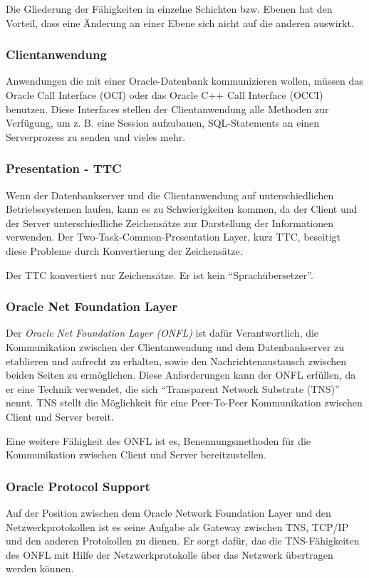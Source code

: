         Die Gliederung der Fähigkeiten in einzelne Schichten bzw. Ebenen hat den Vorteil, dass eine Änderung an einer Ebene sich nicht auf die anderen auswirkt.
        \subsubsection{Clientanwendung}
          Anwendungen die mit einer Oracle-Datenbank kommunizieren wollen, müssen das Oracle Call Interface (OCI) oder das Oracle C++ Call Interface (OCCI) benutzen. Diese Interfaces stellen der Clientanwendung alle Methoden zur Verfügung, um z. B. eine Session aufzubauen, SQL-Statements an einen Serverprozess zu senden und vieles mehr.
        \subsubsection{Presentation - TTC}
          Wenn der Datenbankserver und die Clientanwendung auf unterschiedlichen Betriebssystemen laufen, kann es zu Schwierigkeiten kommen, da der Client und der Server unterschiedliche Zeichensätze zur Darstellung der Informationen verwenden. Der Two-Task-Common-Presentation Layer, kurz TTC, beseitigt diese Probleme durch Konvertierung der Zeichensätze.
          \begin{merke}
            Der TTC konvertiert nur Zeichensätze. Er ist kein \enquote{Sprachübersetzer}.
          \end{merke}


        \subsubsection{Oracle Net Foundation Layer}
          Der \textit{Oracle Net Foundation Layer (ONFL)} ist dafür Verantwortlich, die Kommunikation zwischen der Clientanwendung und dem Datenbankserver zu etablieren und aufrecht zu erhalten, sowie den Nachrichtenaustausch zwischen beiden Seiten zu ermöglichen. Diese Anforderungen kann der ONFL erfüllen, da er eine Technik verwendet, die sich \enquote{Transparent Network Substrate (TNS)} nennt. TNS stellt die Möglichkeit für eine Peer-To-Peer Kommunikation zwischen Client und Server bereit.

          Eine weitere Fähigkeit des ONFL ist es, Benennungsmethoden für die Kommunikation zwischen Client und Server bereitzustellen.
        \subsubsection{Oracle Protocol Support}
          Auf der Position zwischen dem Oracle Network Foundation Layer und den Netzwerkprotokollen ist es seine Aufgabe als Gateway zwischen TNS, TCP/IP und den anderen Protokollen zu dienen. Er sorgt dafür, das die TNS-Fähigkeiten des ONFL mit Hilfe der Netzwerkprotokolle über das Netzwerk übertragen werden können.

